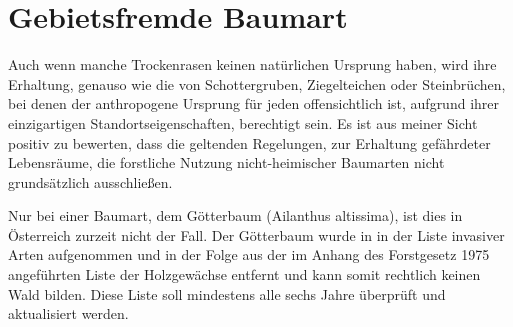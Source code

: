 \documentclass[twocolumn]{scrartcl}
\begin{document}
\section{Gebietsfremde Baumart}

Auch wenn manche Trockenrasen keinen natürlichen Ursprung haben, wird ihre
Erhaltung, genauso wie die von Schottergruben, Ziegelteichen oder Steinbrüchen,
bei denen der anthropogene Ursprung für jeden offensichtlich ist, aufgrund ihrer
einzigartigen Standortseigenschaften, berechtigt sein. Es ist aus meiner Sicht
positiv zu bewerten, dass die geltenden Regelungen, zur Erhaltung gefährdeter
Lebensräume, die forstliche Nutzung nicht-heimischer Baumarten nicht
grundsätzlich ausschließen.

Nur bei einer Baumart, dem Götterbaum (Ailanthus
altissima), ist dies in Österreich zurzeit nicht der Fall. Der Götterbaum wurde
in in der Liste invasiver Arten aufgenommen
\citep{eu2019verordnungListeInvasiverArten,eu2014verordnungInvasiverArten} und
in der Folge aus der im Anhang des Forstgesetz 1975 angeführten Liste der
Holzgewächse entfernt und kann somit rechtlich keinen Wald bilden. Diese Liste
soll mindestens alle sechs Jahre überprüft und aktualisiert werden.
\end{document}
